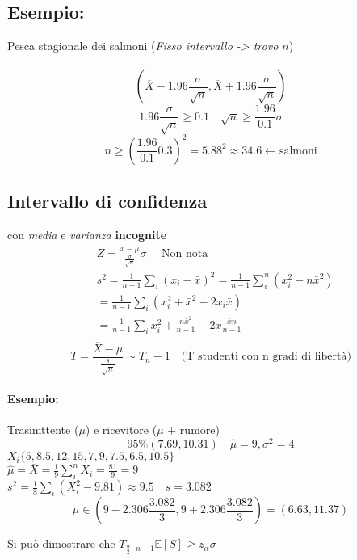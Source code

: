 \documentclass[]{article}
\newcommand{\ev}{\mathbb{E}[X]}
\renewcommand{\ev}[1]{\mathbb{E}[#1]}
\begin{document}
    \subsection{Esempio:} Pesca stagionale dei salmoni (\textit{Fisso intervallo -> trovo $n$}) \\
     \\
    \[ (\overline{X} - 1.96 \frac{\sigma}{\sqrt{n}}, \overline{X} + 1.96 \frac{\sigma}{\sqrt{n}}) \]
    \[ 1.96 \frac{\sigma}{\sqrt{n}} \geq 0.1 \quad \sqrt{n} \geq \frac{1.96}{0.1} \sigma \]
    \[ n \geq (\frac{1.96}{0.1} 0.3)^2 = 5.88^2 \approx 34.6 \leftarrow \text{salmoni} \]
    \subsection{Intervallo di confidenza} con \textit{media} e \textit{varianza} \textbf{incognite}
    \begin{equation*}
        \begin{aligned}
            & Z=\frac{\bar{x}-\mu}{\frac{\sigma}{\sqrt{n}}} \sigma \quad \text{ Non nota} \\
            & s^2=\frac{1}{n-1} \sum_i\left(x_i-\bar{x}\right)^2=\frac{1}{n-1} \sum_i^n\left(x_i^2-n \bar{x}^2\right) \\
            & =\frac{1}{n-1} \sum_i\left(x_i^2+\bar{x}^2-2 x_i \bar{x}\right) \\
            & =\frac{1}{n-1} \sum_i x_i^2+\frac{n \bar{x}^2}{n-1}-2 \bar{x} \frac{\bar{x} n}{n-1} \\
        \end{aligned}
    \end{equation*}
    \[ T = \frac{\overline{X} - \mu}{\frac{s}{\sqrt{n}}} \sim T_n - 1 \quad \text{(T studenti con n gradi di libertà)} \]
    \paragraph{Esempio:} Trasimttente ($\mu$) e ricevitore ($\mu$ + rumore)
    \[ 95\% (7.69, 10.31) \quad \hat{\mu} = 9, \sigma^2 = 4 \]
    $X_i \{ 5, 8.5, 12, 15, 7, 9, 7.5, 6.5, 10.5 \}$ \\
    $\hat{\mu} = \overline{X} = \frac{1}{9} \sum_{i}^{n} X_i = \frac{81}{9} = 9$ \\
    $s^2 = \frac{1}{8}\sum_{i}^{}(X_i^2-9.81) \approx 9.5 \quad s = 3.082$
    \[ \mu \in (9-2.306 \frac{3.082}{3}, 9 + 2.306 \frac{3.082}{3}) = (6.63, 11.37) \]
    \centerline{Si può dimostrare che $T_{\frac{\alpha}{2} \cdot n - 1} \ev{S} \geq z_\alpha\sigma$}
\end{document}
